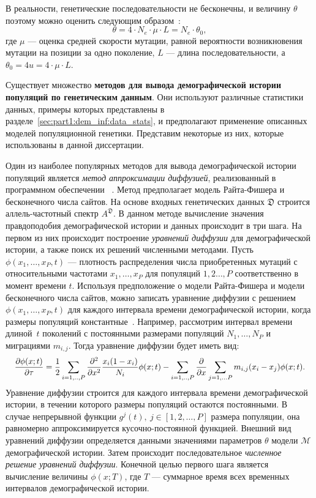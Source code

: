 В реальности, генетические последовательности не бесконечны, и величину $\theta$ поэтому можно оценить следующим образом~\cite{gutenkunst2009inferring}:
\begin{equation*}
     \theta = 4 \cdot N_e \cdot \mu \cdot L =  N_e \cdot \theta_0,
\end{equation*}
где $\mu$ --- оценка средней скорости мутации, равной вероятности возникновения мутации на позиции за одно поколение, $L$ --- длина последовательности, а $\theta_0 = 4 u = 4 \cdot \mu \cdot L$.


Существует множество \textbf{методов для вывода демографической истории популяций по генетическим данным}.
Они используют различные статистики данных, примеры которых представлены в разделе~\ref{sec:part1:dem_inf:data_stats}, и предполагают применение описанных моделей популяционной генетики.
Представим некоторые из них, которые использованы в данной диссертации.

Один из наиболее популярных методов для вывода демографической истории популяций является \emph{метод аппроксимации диффузией}, реализованный в программном обеспечении \dadi~\cite{gutenkunst2009inferring}.
Метод предполагает модель Райта-Фишера и бесконечного числа сайтов.
На основе входных генетических данных $\mathfrak{D}$ строится аллель-частотный спектр $A^{\mathfrak{D}}$.
В данном методе вычисление значения правдоподобия демографической истории и данных происходит в три шага.
На первом из них происходит построение \textit{уравнений диффузии} для демографической истории, а также поиск их решений численными методами.
Пусть $\phi(x_1, \dots, x_P, t)$ --- плотность распределения числа приобретенных мутаций с относительными частотами $x_1, \dots, x_P$ для популяций $1, 2 \dots, P$ соответственно в момент времени $t$.
Используя предположение о модели Райта-Фишера и модели бесконечного числа сайтов, можно записать уравнение диффузии с решением $\phi(x_1, \dots, x_P, t)$ для каждого интервала времени демографической истории, когда размеры популяций константные~\cite{kimura1964diffusion}.
Например, рассмотрим интервал времени длиной~$t$ поколений с постоянными размерами популяций $N_1, \dots, N_P$ и миграциями $m_{i,j}$.
Тогда уравнение диффузии будет иметь вид:
\begin{equation*}
    \scalemath{0.95}{
    \frac{\partial \phi (x; t)}{\partial \tau} = \frac{1}{2}\sum _{i=1,..,P}\frac{\partial ^2}{\partial x^2}\frac{x_i(1-x_i)}{N_i}\phi(x; t) - \sum _{i=1,..,P}\frac{\partial }{\partial x} \sum_{j=1,...P}m_{i,j}(x_i - x_j) \phi(x; t).%
    }
\end{equation*}
Уравнение диффузии строится для каждого интервала времени демографической истории, в течении которого размеры популяций остаются постоянными.
В случае непрерывной функции $g^j(t),\ j \in [1, 2, \dots, P]$ размера популяции, она равномерно аппроксимируется кусочно-постоянной функцией.
Внешний вид уравнений диффузии определяется данными значениями параметров $\theta$ модели $\mathcal{M}$ демографической истории.
Затем происходит последовательное \textit{численное решение уравнений диффузии}.
Конечной целью первого шага является вычисление величины $\phi(x; T)$, где $T$ --- суммарное время всех временных интервалов демографической истории.

